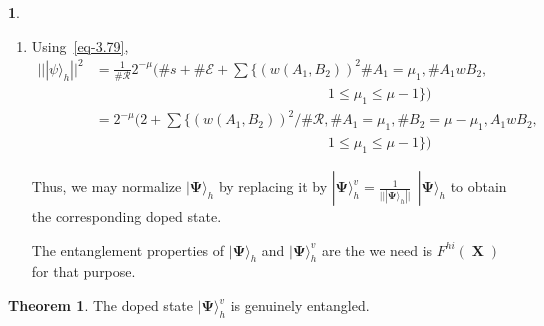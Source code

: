 \documentclass[a4paper,12pt]{article}
\DeclareMathOperator{\x}{\mathrm{X}}
\theoremstyle{definition}
\theoremstyle{underlinethm}
\newtheorem{thm}{Theorem}[section]
\theoremstyle{definition}
\newtheorem{subsubsec}{}[subsection]
\begin{document}
\begin{subsubsec}
\begin{enumerate}[label=(\alph*)]
\item Using~\eqref{eq-3.79}, 
\begin{align*}
|| | \psi \rangle_{h} ||^{2} &= \frac{1}{\# \mathcal{R}} 2^{-\mu} \bigg(\# s + \# \mathcal{E} + \sum\bigg\{ (w(A_{1}, B_{2}))^{2} \# A_{1}=\mu_{1}, \# A_{1} wB_{2},  \\
&\hspace{7cm} 1 \leq \mu_{1} \leq \mu-1\bigg\}\bigg)\\
& = 2^{-\mu} \bigg(2 + \sum \bigg\{(w(A_{1}, B_{2}))^{2} /\# \mathcal{R}, \# A_{1}=\mu_{1}, \# B_{2}=\mu-\mu_{1}, A_{1}wB_{2},\\&\hspace{7cm} 1 \leq \mu_{1} \leq \mu-1 \bigg\} \bigg)\tag{3.80}\label{eq-3.80}
\end{align*}

Thus, we may normalize $| \boldsymbol{\Psi} \rangle_{h}$ by replacing it by $| \boldsymbol{\Psi} \rangle_{h}^{v} = \frac{1}{|| | \boldsymbol{\Psi}\rangle_{h}||} ~~ | \boldsymbol{\Psi} \rangle_{h}$ to obtain the corresponding doped state.

The entanglement properties of $| \boldsymbol{\Psi} \rangle_{h}$ and $| \boldsymbol{\Psi}\rangle_{h}^{v}$ are the we need is $F^{hi}(\boldsymbol{\x})$ for that purpose.
\end{enumerate}
\end{subsubsec}

\begin{thm}\label{thm-3.9}
The doped state $| \boldsymbol{\Psi}\rangle_{h}^{v}$ is genuinely entangled.
\end{thm}
\end{document}
